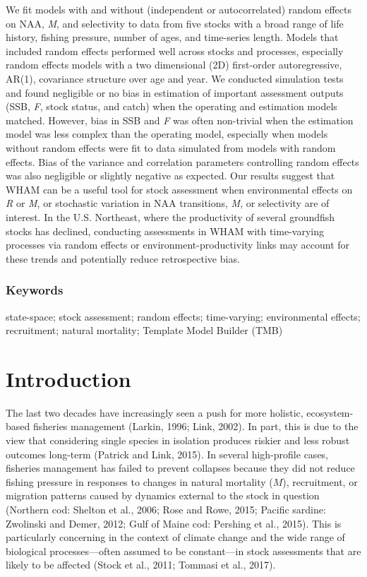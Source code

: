 \documentclass[]{article}
\begin{document}
We fit models with and without (independent or autocorrelated) random
effects on NAA, \emph{M}, and selectivity to data from five stocks with
a broad range of life history, fishing pressure, number of ages, and
time-series length. Models that included random effects performed well
across stocks and processes, especially random effects models with a two
dimensional (2D) first-order autoregressive, AR(1), covariance structure
over age and year. We conducted simulation tests and found negligible or
no bias in estimation of important assessment outputs (SSB, \emph{F},
stock status, and catch) when the operating and estimation models
matched. However, bias in SSB and \emph{F} was often non-trivial when
the estimation model was less complex than the operating model,
especially when models without random effects were fit to data simulated
from models with random effects. Bias of the variance and correlation
parameters controlling random effects was also negligible or slightly
negative as expected. Our results suggest that WHAM can be a useful tool
for stock assessment when environmental effects on \emph{R} or \emph{M},
or stochastic variation in NAA transitions, \emph{M}, or selectivity are
of interest. In the U.S. Northeast, where the productivity of several
groundfish stocks has declined, conducting assessments in WHAM with
time-varying processes via random effects or environment-productivity
links may account for these trends and potentially reduce retrospective
bias.

\hypertarget{keywords}{%
\subsubsection*{Keywords}\label{keywords}}

state-space; stock assessment; random effects; time-varying;
environmental effects; recruitment; natural mortality; Template Model
Builder (TMB)

\pagebreak

\hypertarget{introduction}{%
\section{Introduction}\label{introduction}}

The last two decades have increasingly seen a push for more holistic,
ecosystem-based fisheries management (Larkin, 1996; Link, 2002). In
part, this is due to the view that considering single species in
isolation produces riskier and less robust outcomes long-term (Patrick
and Link, 2015). In several high-profile cases, fisheries management has
failed to prevent collapses because they did not reduce fishing pressure
in responses to changes in natural mortality (\(M\)), recruitment, or
migration patterns caused by dynamics external to the stock in question
(Northern cod: Shelton et al., 2006; Rose and Rowe, 2015; Pacific
sardine: Zwolinski and Demer, 2012; Gulf of Maine cod: Pershing et al.,
2015). This is particularly concerning in the context of climate change
and the wide range of biological processes---often assumed to be
constant---in stock assessments that are likely to be affected (Stock et
al., 2011; Tommasi et al., 2017).
\end{document}
